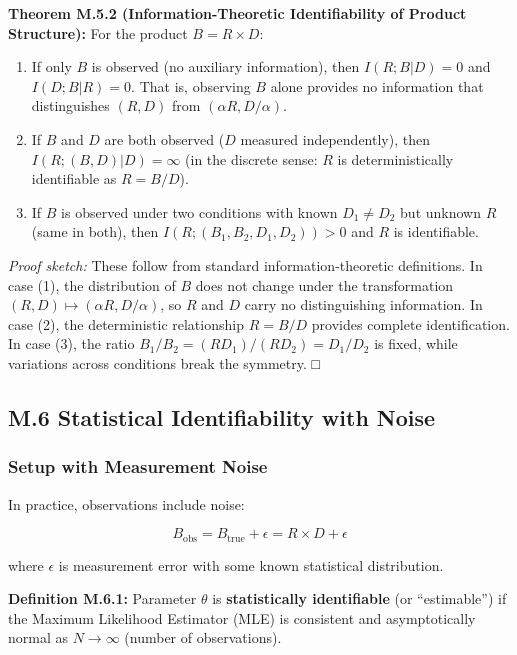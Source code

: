 \documentclass[
]{article}
\begin{document}
\textbf{Theorem M.5.2 (Information-Theoretic Identifiability of Product
Structure):} For the product \(B = R \times D\):

\begin{enumerate}
\def\labelenumi{\arabic{enumi}.}
\item
  If only \(B\) is observed (no auxiliary information), then
  \(I(R; B | D) = 0\) and \(I(D; B | R) = 0\). That is, observing \(B\)
  alone provides no information that distinguishes \((R, D)\) from
  \((\alpha R, D/\alpha)\).
\item
  If \(B\) and \(D\) are both observed (\(D\) measured independently),
  then \(I(R; (B, D) | D) = \infty\) (in the discrete sense: \(R\) is
  deterministically identifiable as \(R = B/D\)).
\item
  If \(B\) is observed under two conditions with known \(D_1 \neq D_2\)
  but unknown \(R\) (same in both), then
  \(I(R; (B_1, B_2, D_1, D_2)) > 0\) and \(R\) is identifiable.
\end{enumerate}

\emph{Proof sketch:} These follow from standard information-theoretic
definitions. In case (1), the distribution of \(B\) does not change
under the transformation \((R, D) \mapsto (\alpha R, D/\alpha)\), so
\(R\) and \(D\) carry no distinguishing information. In case (2), the
deterministic relationship \(R = B/D\) provides complete identification.
In case (3), the ratio \(B_1/B_2 = (R D_1) / (R D_2) = D_1/D_2\) is
fixed, while variations across conditions break the symmetry. □

\subsection{M.6 Statistical Identifiability with
Noise}\label{m.6-statistical-identifiability-with-noise}

\subsubsection{Setup with Measurement
Noise}\label{setup-with-measurement-noise}

In practice, observations include noise:

\[B_{\text{obs}} = B_{\text{true}} + \epsilon = R \times D + \epsilon\]

where \(\epsilon\) is measurement error with some known statistical
distribution.

\textbf{Definition M.6.1:} Parameter \(\theta\) is \textbf{statistically
identifiable} (or ``estimable'') if the Maximum Likelihood Estimator
(MLE) is consistent and asymptotically normal as \(N \to \infty\)
(number of observations).
\end{document}

